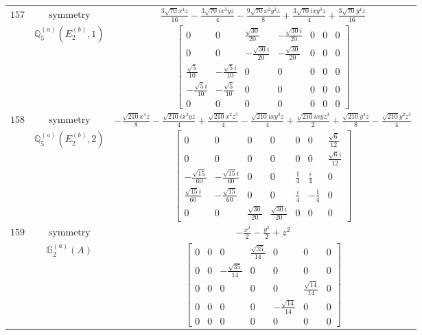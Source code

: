 \documentclass[fleqn,8pt,landscape]{jsarticle}
\begin{document}
\begin{longtable}{ccc}
$ 157 $ & $ \text{symmetry} $ & $ \frac{3 \sqrt{70} x^{4} z}{16} - \frac{3 \sqrt{70} i x^{3} y z}{4} - \frac{9 \sqrt{70} x^{2} y^{2} z}{8} + \frac{3 \sqrt{70} i x y^{3} z}{4} + \frac{3 \sqrt{70} y^{4} z}{16} $ \\
$  $ & $ \mathbb{Q}_{5}^{(a)}(E_{2}^{(b)},1) $ & $ \begin{bmatrix} 0 & 0 & \frac{\sqrt{30}}{20} & - \frac{\sqrt{30} i}{20} & 0 & 0 & 0 \\ 0 & 0 & - \frac{\sqrt{30} i}{20} & - \frac{\sqrt{30}}{20} & 0 & 0 & 0 \\ \frac{\sqrt{5}}{10} & - \frac{\sqrt{5} i}{10} & 0 & 0 & 0 & 0 & 0 \\ - \frac{\sqrt{5} i}{10} & - \frac{\sqrt{5}}{10} & 0 & 0 & 0 & 0 & 0 \\ 0 & 0 & 0 & 0 & 0 & 0 & 0 \end{bmatrix} $ \\ \hline
$ 158 $ & $ \text{symmetry} $ & $ - \frac{\sqrt{210} x^{4} z}{8} - \frac{\sqrt{210} i x^{3} y z}{4} + \frac{\sqrt{210} x^{2} z^{3}}{4} - \frac{\sqrt{210} i x y^{3} z}{4} + \frac{\sqrt{210} i x y z^{3}}{2} + \frac{\sqrt{210} y^{4} z}{8} - \frac{\sqrt{210} y^{2} z^{3}}{4} $ \\
$  $ & $ \mathbb{Q}_{5}^{(a)}(E_{2}^{(b)},2) $ & $ \begin{bmatrix} 0 & 0 & 0 & 0 & 0 & 0 & \frac{\sqrt{6}}{12} \\ 0 & 0 & 0 & 0 & 0 & 0 & \frac{\sqrt{6} i}{12} \\ - \frac{\sqrt{15}}{60} & - \frac{\sqrt{15} i}{60} & 0 & 0 & \frac{1}{4} & \frac{i}{4} & 0 \\ \frac{\sqrt{15} i}{60} & - \frac{\sqrt{15}}{60} & 0 & 0 & \frac{i}{4} & - \frac{1}{4} & 0 \\ 0 & 0 & \frac{\sqrt{30}}{20} & \frac{\sqrt{30} i}{20} & 0 & 0 & 0 \end{bmatrix} $ \\ \hline
$ 159 $ & $ \text{symmetry} $ & $ - \frac{x^{2}}{2} - \frac{y^{2}}{2} + z^{2} $ \\
$  $ & $ \mathbb{G}_{2}^{(a)}(A) $ & $ \begin{bmatrix} 0 & 0 & 0 & \frac{\sqrt{35}}{14} & 0 & 0 & 0 \\ 0 & 0 & - \frac{\sqrt{35}}{14} & 0 & 0 & 0 & 0 \\ 0 & 0 & 0 & 0 & 0 & \frac{\sqrt{14}}{14} & 0 \\ 0 & 0 & 0 & 0 & - \frac{\sqrt{14}}{14} & 0 & 0 \\ 0 & 0 & 0 & 0 & 0 & 0 & 0 \end{bmatrix} $ \\ \hline

\end{longtable}
\end{document}
